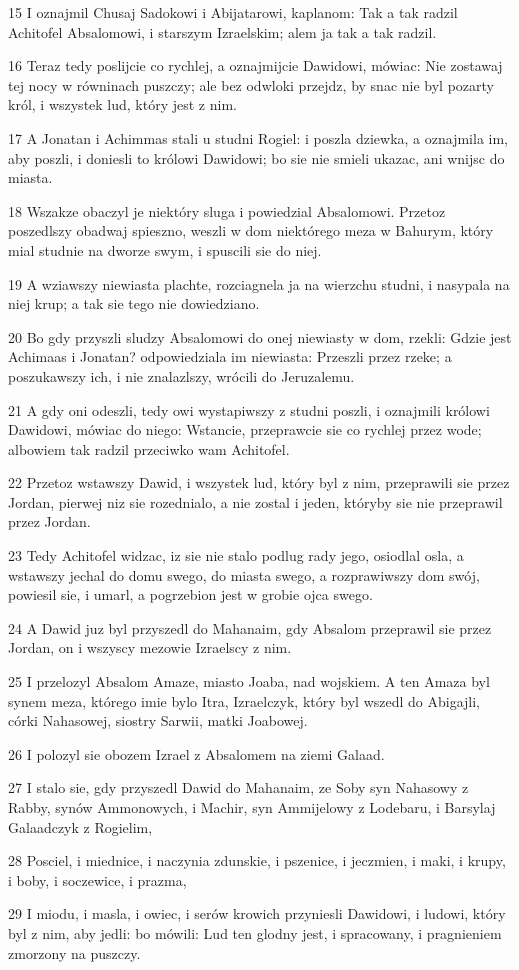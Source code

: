 \par 15 I oznajmil Chusaj Sadokowi i Abijatarowi, kaplanom: Tak a tak radzil Achitofel Absalomowi, i starszym Izraelskim; alem ja tak a tak radzil.
\par 16 Teraz tedy poslijcie co rychlej, a oznajmijcie Dawidowi, mówiac: Nie zostawaj tej nocy w równinach puszczy; ale bez odwloki przejdz, by snac nie byl pozarty król, i wszystek lud, który jest z nim.
\par 17 A Jonatan i Achimmas stali u studni Rogiel: i poszla dziewka, a oznajmila im, aby poszli, i doniesli to królowi Dawidowi; bo sie nie smieli ukazac, ani wnijsc do miasta.
\par 18 Wszakze obaczyl je niektóry sluga i powiedzial Absalomowi. Przetoz poszedlszy obadwaj spieszno, weszli w dom niektórego meza w Bahurym, który mial studnie na dworze swym, i spuscili sie do niej.
\par 19 A wziawszy niewiasta plachte, rozciagnela ja na wierzchu studni, i nasypala na niej krup; a tak sie tego nie dowiedziano.
\par 20 Bo gdy przyszli sludzy Absalomowi do onej niewiasty w dom, rzekli: Gdzie jest Achimaas i Jonatan? odpowiedziala im niewiasta: Przeszli przez rzeke; a poszukawszy ich, i nie znalazlszy, wrócili do Jeruzalemu.
\par 21 A gdy oni odeszli, tedy owi wystapiwszy z studni poszli, i oznajmili królowi Dawidowi, mówiac do niego: Wstancie, przeprawcie sie co rychlej przez wode; albowiem tak radzil przeciwko wam Achitofel.
\par 22 Przetoz wstawszy Dawid, i wszystek lud, który byl z nim, przeprawili sie przez Jordan, pierwej niz sie rozednialo, a nie zostal i jeden, któryby sie nie przeprawil przez Jordan.
\par 23 Tedy Achitofel widzac, iz sie nie stalo podlug rady jego, osiodlal osla, a wstawszy jechal do domu swego, do miasta swego, a rozprawiwszy dom swój, powiesil sie, i umarl, a pogrzebion jest w grobie ojca swego.
\par 24 A Dawid juz byl przyszedl do Mahanaim, gdy Absalom przeprawil sie przez Jordan, on i wszyscy mezowie Izraelscy z nim.
\par 25 I przelozyl Absalom Amaze, miasto Joaba, nad wojskiem. A ten Amaza byl synem meza, którego imie bylo Itra, Izraelczyk, który byl wszedl do Abigajli, córki Nahasowej, siostry Sarwii, matki Joabowej.
\par 26 I polozyl sie obozem Izrael z Absalomem na ziemi Galaad.
\par 27 I stalo sie, gdy przyszedl Dawid do Mahanaim, ze Soby syn Nahasowy z Rabby, synów Ammonowych, i Machir, syn Ammijelowy z Lodebaru, i Barsylaj Galaadczyk z Rogielim,
\par 28 Posciel, i miednice, i naczynia zdunskie, i pszenice, i jeczmien, i maki, i krupy, i boby, i soczewice, i prazma,
\par 29 I miodu, i masla, i owiec, i serów krowich przyniesli Dawidowi, i ludowi, który byl z nim, aby jedli: bo mówili: Lud ten glodny jest, i spracowany, i pragnieniem zmorzony na puszczy.

